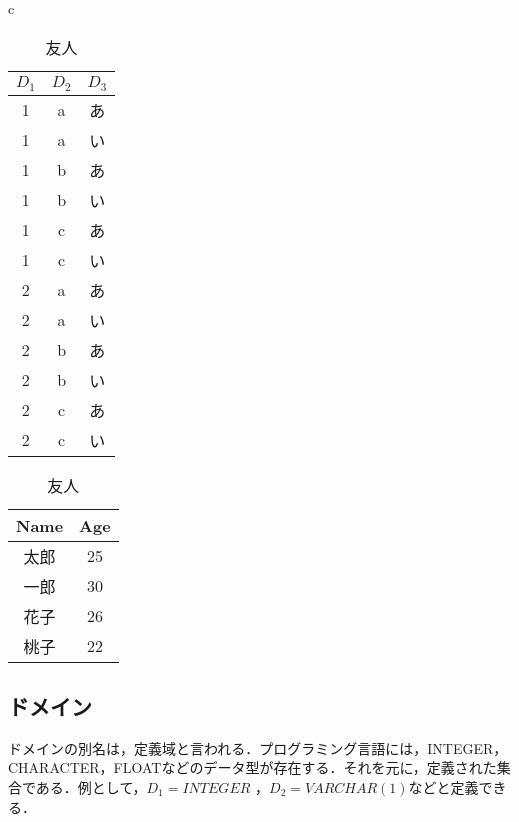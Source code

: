 \documentclass[a4paper,10pt]{jreport}
\begin{document}
\begin{table}[htp]
	\begin{center}
		\begin{tabular}{c}
			\begin{minipage}{0.5\hsize}
				\begin{center}
					\caption{リレーションのサンプル}
					\label{tbl:リレーションのサンプル}
					\begin{tabular}{|c|c|c|} \hline
						$D_1$ & $D_2$ & $D_3$ \\ \hline \hline
						1 & a & あ \\ \hline
						1 & a & い \\ \hline
						1 & b & あ \\ \hline
						1 & b & い \\ \hline
						1 & c & あ \\ \hline
						1 & c & い \\ \hline
						2 & a & あ \\ \hline
						2 & a & い \\ \hline
						2 & b & あ \\ \hline
						2 & b & い \\ \hline
						2 & c & あ \\ \hline
						2 & c & い \\ \hline
					\end{tabular}
				\end{center}
			\end{minipage}
			\begin{minipage}{0.5\hsize}
				\begin{center}
					\caption{友人}
					\label{tbl:友人}
					\begin{tabular}{|c|c|}\hline
						Name & Age \\ \hline \hline
						太郎 & 25 \\ \hline
						一郎 & 30 \\ \hline
						花子 & 26 \\ \hline
						桃子 & 22 \\ \hline
					\end{tabular}
				\end{center}
			\end{minipage}
		\end{tabular}
	\end{center}
\end{table}

\subsection{ドメイン}
ドメインの別名は，定義域と言われる．プログラミング言語には，INTEGER，CHARACTER，FLOATなどのデータ型が存在する．それを元に，定義された集合である．例として，$D_1=INTEGER$ ，$D_2=VARCHAR(1)$などと定義できる．
\end{document}
